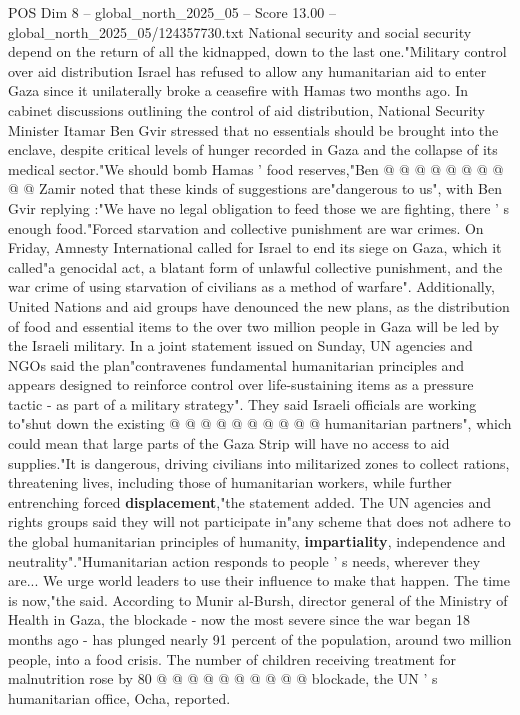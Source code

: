 \begin{textsample}{POS Dim 8 – global\_north\_2025\_05 – Score 13.00 – global\_north\_2025\_05/124357730.txt}
National security and social security depend on the return of all the kidnapped, down to the last one."Military control over aid distribution Israel has refused to allow any humanitarian aid to enter Gaza since it unilaterally broke a ceasefire with Hamas two months ago.
In cabinet discussions outlining the control of aid distribution, National Security Minister Itamar Ben Gvir stressed that no essentials should be brought into the enclave, despite critical levels of hunger recorded in Gaza and the collapse of its medical sector."We should bomb Hamas ' food reserves,"Ben @ @ @ @ @ @ @ @ @ @ Zamir noted that these kinds of suggestions are"dangerous to us", with Ben Gvir replying :"We have no legal obligation to feed those we are fighting, there ' s enough food."Forced starvation and collective punishment are war crimes.
On Friday, Amnesty International called for Israel to end its siege on Gaza, which it called"a genocidal act, a blatant form of unlawful collective punishment, and the war crime of using starvation of civilians as a method of warfare".
Additionally, United Nations and aid groups have denounced the new plans, as the distribution of food and essential items to the over two million people in Gaza will be led by the Israeli military.
In a joint statement issued on Sunday, UN agencies and NGOs said the plan"contravenes fundamental humanitarian principles and appears designed to reinforce control over life-sustaining items as a pressure tactic - as part of a military strategy".
They said Israeli officials are working to"shut down the existing @ @ @ @ @ @ @ @ @ @ humanitarian partners", which could mean that large parts of the Gaza Strip will have no access to aid supplies."It is dangerous, driving civilians into militarized zones to collect rations, threatening lives, including those of humanitarian workers, while further entrenching forced \textbf{displacement},"the statement added.
The UN agencies and rights groups said they will not participate in"any scheme that does not adhere to the global humanitarian principles of humanity, \textbf{impartiality}, independence and neutrality"."Humanitarian action responds to people ' s needs, wherever they are...
We urge world leaders to use their influence to make that happen.
The time is now,"the said.
According to Munir al-Bursh, director general of the Ministry of Health in Gaza, the blockade - now the most severe since the war began 18 months ago - has plunged nearly 91 percent of the population, around two million people, into a food crisis.
The number of children receiving treatment for malnutrition rose by 80 @ @ @ @ @ @ @ @ @ @ blockade, the UN ' s humanitarian office, Ocha, reported.

\end{textsample}
